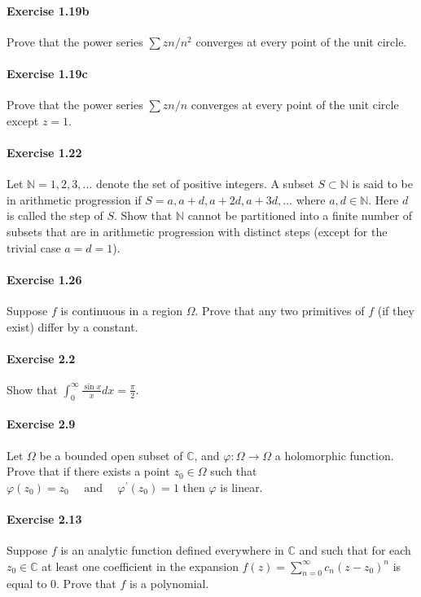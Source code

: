 \documentclass{article}
\begin{document}
\paragraph{Exercise 1.19b} Prove that the power series $\sum zn/n^2$ converges at every point of the unit circle.


\paragraph{Exercise 1.19c} Prove that the power series $\sum zn/n$ converges at every point of the unit circle except $z = 1$.


\paragraph{Exercise 1.22} Let $\mathbb{N} = {1, 2, 3, \ldots}$ denote the set of positive integers. A subset $S \subset \mathbb{N}$ is said to be in arithmetic progression if $S = {a, a + d, a + 2d, a + 3d, \ldots}$ where $a, d \in \mathbb{N}$. Here $d$ is called the step of $S$.  Show that $\mathbb{N}$ cannot be partitioned into a finite number of subsets that are in arithmetic progression with distinct steps (except for the trivial case $a = d = 1$).


\paragraph{Exercise 1.26} Suppose $f$ is continuous in a region $\Omega$. Prove that any two primitives of $f$ (if they exist) differ by a constant.


\paragraph{Exercise 2.2} Show that $\int_{0}^{\infty} \frac{\sin x}{x} d x=\frac{\pi}{2}$.


\paragraph{Exercise 2.9} Let $\Omega$ be a bounded open subset of $\mathbb{C}$, and $\varphi: \Omega \rightarrow \Omega$ a holomorphic function. Prove that if there exists a point $z_{0} \in \Omega$ such that $\varphi\left(z_{0}\right)=z_{0} \quad \text { and } \quad \varphi^{\prime}\left(z_{0}\right)=1$ then $\varphi$ is linear.


\paragraph{Exercise 2.13} Suppose $f$ is an analytic function defined everywhere in $\mathbb{C}$ and such that for each $z_0 \in \mathbb{C}$ at least one coefficient in the expansion $f(z) = \sum_{n=0}^\infty c_n(z - z_0)^n$ is equal to 0. Prove that $f$ is a polynomial.
\end{document}

